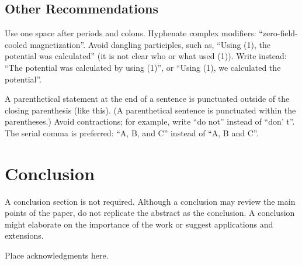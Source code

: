 \documentclass{ifacconf}
\begin{document}
\subsection{Other Recommendations}

Use one space after periods and colons. Hyphenate complex modifiers:
``zero-field-cooled magnetization''. Avoid dangling participles, such
as, ``Using (1), the potential was calculated'' (it is not clear who or
what used (1)). Write instead: ``The potential was calculated by using
(1)'', or ``Using (1), we calculated the potential''.

A parenthetical statement at the end of a sentence is punctuated
outside of the closing parenthesis (like this). (A parenthetical
sentence is punctuated within the parentheses.) Avoid contractions;
for example, write ``do not'' instead of ``don' t''. The serial comma
is preferred: ``A, B, and C'' instead of ``A, B and C''.


\section{Conclusion}

A conclusion section is not required. Although a conclusion may review
the main points of the paper, do not replicate the abstract as the
conclusion. A conclusion might elaborate on the importance of the work
or suggest applications and extensions.

\begin{ack}
Place acknowledgments here.
\end{ack}

                                                   



\end{document}
